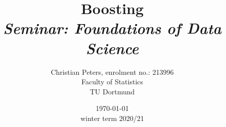 \documentclass[a4paper,12pt]{article}
\title{Boosting\\
	\emph{Seminar: Foundations of Data Science}}
\author{Christian Peters, enrolment no.: 213996\\
	Faculty of Statistics\\
	TU Dortmund}
\date{\today\\ winter term 2020/21}
\begin{document}
\maketitle
\linenumbers






	




\nolinenumbers
\footnotesize


\end{document}
